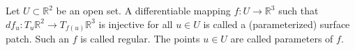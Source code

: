 Let $U \subset \mathbb{R}^2$ be an open set. A differentiable mapping $f: U \to \mathbb{R}^3$ such that $df_u: T_u\mathbb{R}^2 \to T_{f(u)}\mathbb{R}^3$ is injective for all $u \in U$ is called a (parameterized) surface patch. Such an $f$ is called regular. The points $u \in U$ are called parameters of $f$.